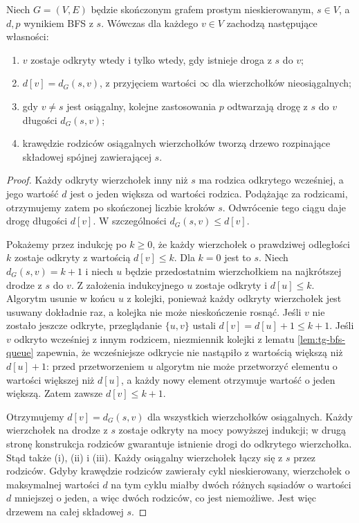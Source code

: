 \begin{twierdzenie}
\label{thm:tg-bfs-correct}
Niech $G=(V,E)$ będzie skończonym grafem prostym
nieskierowanym, $s\in V$, a $d,p$ wynikiem BFS z $s$.
Wówczas dla każdego $v\in V$ zachodzą następujące własności:
\begin{enumerate}[label=(\roman*)]
\item $v$ zostaje odkryty wtedy i tylko wtedy, gdy istnieje
      droga z $s$ do $v$;
\item $d[v]=d_G(s,v)$, z przyjęciem wartości $\infty$
      dla wierzchołków nieosiągalnych;
\item gdy $v\neq s$ jest osiągalny, kolejne zastosowania $p$
      odtwarzają drogę z $s$ do $v$ długości $d_G(s,v)$;
\item krawędzie rodziców osiągalnych wierzchołków tworzą
      drzewo rozpinające składowej spójnej zawierającej $s$.
\end{enumerate}
\end{twierdzenie}
\begin{proof}
Każdy odkryty wierzchołek inny niż $s$ ma rodzica
odkrytego wcześniej, a jego wartość $d$ jest o jeden
większa od wartości rodzica. Podążając za rodzicami,
otrzymujemy zatem po skończonej liczbie kroków $s$.
Odwrócenie tego ciągu daje drogę długości $d[v]$.
W szczególności $d_G(s,v)\leq d[v]$.

Pokażemy przez indukcję po $k\geq0$, że każdy wierzchołek
o prawdziwej odległości $k$ zostaje odkryty z wartością
$d[v]\leq k$. Dla $k=0$ jest to $s$.
Niech $d_G(s,v)=k+1$ i niech $u$ będzie przedostatnim
wierzchołkiem na najkrótszej drodze z $s$ do $v$.
Z założenia indukcyjnego $u$ zostaje odkryty i
$d[u]\leq k$. Algorytm usunie w końcu $u$ z kolejki,
ponieważ każdy odkryty wierzchołek jest usuwany dokładnie
raz, a kolejka nie może nieskończenie rosnąć.
Jeśli $v$ nie zostało jeszcze odkryte, przeglądanie
$\{u,v\}$ ustali $d[v]=d[u]+1\leq k+1$.
Jeśli $v$ odkryto wcześniej z innym rodzicem,
niezmiennik kolejki z lematu
\ref{lem:tg-bfs-queue} zapewnia, że wcześniejsze
odkrycie nie nastąpiło z wartością większą niż
$d[u]+1$: przed przetworzeniem $u$ algorytm nie może
przetworzyć elementu o wartości większej niż $d[u]$,
a każdy nowy element otrzymuje wartość o jeden większą.
Zatem zawsze $d[v]\leq k+1$.

Otrzymujemy $d[v]=d_G(s,v)$ dla wszystkich wierzchołków
osiągalnych. Każdy wierzchołek na drodze z $s$
zostaje odkryty na mocy powyższej indukcji;
w drugą stronę konstrukcja rodziców gwarantuje
istnienie drogi do odkrytego wierzchołka.
Stąd także (i), (ii) i (iii).
Każdy osiągalny wierzchołek łączy się z $s$ przez rodziców.
Gdyby krawędzie rodziców zawierały cykl nieskierowany,
wierzchołek o maksymalnej wartości $d$ na tym cyklu
miałby dwóch różnych sąsiadów o wartości $d$ mniejszej o jeden,
a więc dwóch rodziców, co jest niemożliwe.
Jest więc drzewem na całej składowej $s$.
\end{proof}

